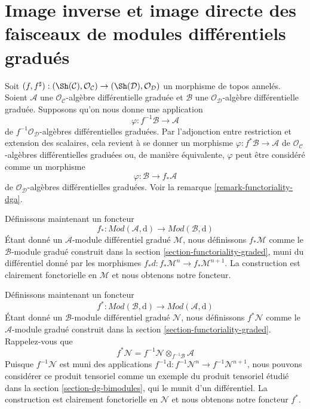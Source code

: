 \section{Image inverse et image directe des faisceaux de modules différentiels gradués}
\label{section-functoriality-dg}

\noindent
Soit $(f, f^\sharp) : (\Sh(\mathcal{C}), \mathcal{O}_\mathcal{C}) \to (\Sh(\mathcal{D}), \mathcal{O}_\mathcal{D})$ un morphisme de topos annelés.
Soient $\mathcal{A}$ une $\mathcal{O}_\mathcal{C}$-algèbre différentielle graduée et $\mathcal{B}$ une $\mathcal{O}_\mathcal{D}$-algèbre différentielle graduée.
Supposons qu'on nous donne une application
$$
\varphi : f^{-1}\mathcal{B} \to \mathcal{A}
$$
de $f^{-1}\mathcal{O}_\mathcal{D}$-algèbres différentielles graduées.
Par l'adjonction entre restriction et extension des scalaires, cela revient à se donner un morphisme $\varphi : f^*\mathcal{B} \to \mathcal{A}$ de $\mathcal{O}_\mathcal{C}$-algèbres différentielles graduées ou, de manière équivalente, $\varphi$ peut être considéré comme un morphisme
$$
\varphi : \mathcal{B} \to f_*\mathcal{A}
$$
de $\mathcal{O}_\mathcal{D}$-algèbres différentielles graduées.
Voir la remarque \ref{remark-functoriality-dga}.

\medskip\noindent
Définissons maintenant un foncteur
$$
f_* :
\textit{Mod}(\mathcal{A}, \text{d})
\longrightarrow
\textit{Mod}(\mathcal{B}, \text{d})
$$
Étant donné un $\mathcal{A}$-module différentiel gradué $\mathcal{M}$, nous définissons $f_*\mathcal{M}$ comme le $\mathcal{B}$-module gradué construit dans la section \ref{section-functoriality-graded}, muni du différentiel donné par les morphismes $f_*d : f_*\mathcal{M}^n \to f_*\mathcal{M}^{n + 1}$.
La construction est clairement fonctorielle en $\mathcal{M}$ et nous obtenons notre foncteur.

\medskip\noindent
Définissons maintenant un foncteur
$$
f^* :
\textit{Mod}(\mathcal{B}, \text{d})
\longrightarrow
\textit{Mod}(\mathcal{A}, \text{d})
$$
Étant donné un $\mathcal{B}$-module différentiel gradué $\mathcal{N}$, nous définissons $f^*\mathcal{N}$ comme le $\mathcal{A}$-module gradué construit dans la section \ref{section-functoriality-graded}.
Rappelez-vous que
$$
f^*\mathcal{N} = f^{-1}\mathcal{N} \otimes_{f^{-1}\mathcal{B}} \mathcal{A}
$$
Puisque $f^{-1}\mathcal{N}$ est muni des applications $f^{-1}\text{d} : f^{-1}\mathcal{N}^n \to f^{-1}\mathcal{N}^{n + 1}$, nous pouvons considérer ce produit tensoriel comme un exemple du produit tensoriel étudié dans la section \ref{section-dg-bimodules}, qui le munit d'un différentiel.
La construction est clairement fonctorielle en $\mathcal{N}$ et nous obtenons notre foncteur $f^*$.

